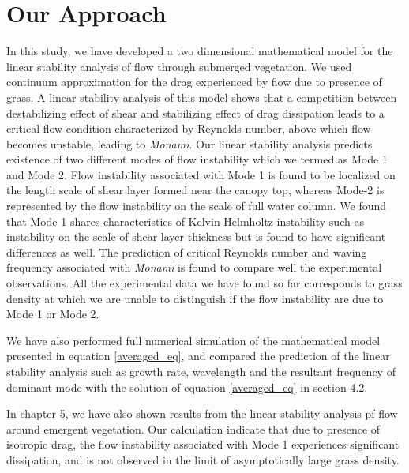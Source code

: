 \documentclass[12pt]{report}   %
\begin{document}
\section{Our Approach}
In this study, we have developed a two dimensional mathematical model for the linear stability analysis of flow through submerged vegetation. We used continuum approximation for the drag experienced by flow due to presence of grass. A linear stability analysis of this model shows that a competition between destabilizing effect of shear and stabilizing effect of drag dissipation leads to a critical flow condition characterized by Reynolds number, above which flow becomes unstable, leading to \textit{Monami}. Our linear stability analysis predicts existence of two different modes of flow instability which we termed as Mode 1 and Mode 2. Flow instability associated with Mode 1 is found to be localized on the length scale of shear layer formed near the canopy top, whereas Mode-2 is represented by the flow instability on the scale of full water column. We found that Mode 1 shares characteristics of Kelvin-Helmholtz instability such as instability on the scale of 
shear layer thickness but is found to have significant differences as well. The prediction of critical Reynolds number and waving frequency associated with \textit{Monami} is found to compare well the experimental observations. All the experimental data we have found so far corresponds to grass density at which we are unable to distinguish if the flow instability are due to Mode 1 or Mode 2.

We have also performed full numerical simulation of the mathematical model presented in equation \eqref{averaged_eq}, and compared the prediction of the linear stability analysis such as growth rate, wavelength and the resultant frequency of dominant mode with the solution of equation \eqref{averaged_eq} in section 4.2.

In chapter 5, we have also shown results from the linear stability analysis pf flow around emergent vegetation. Our calculation indicate that due to presence of isotropic drag, the flow instability associated with Mode 1 experiences significant dissipation, and is not observed in the limit of asymptotically large grass density. %

%
\clearpage{\pagestyle{empty}\cleardoublepage}
\end{document}
